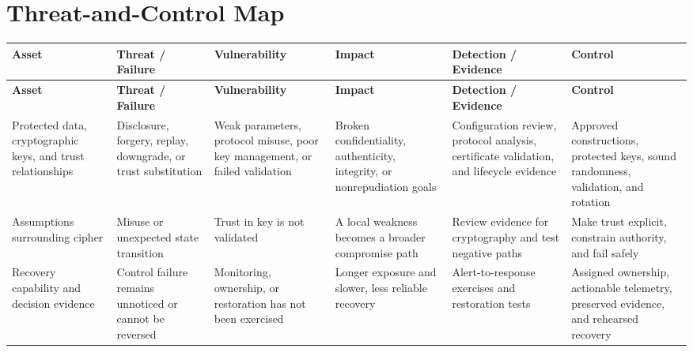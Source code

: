 \documentclass[11pt]{article}
\begin{document}
\section*{Threat-and-Control Map}
\begingroup\scriptsize\setlength{\tabcolsep}{2pt}
\begin{longtable}{>{\RaggedRight\arraybackslash}p{}>{\RaggedRight\arraybackslash}p{}>{\RaggedRight\arraybackslash}p{}>{\RaggedRight\arraybackslash}p{}>{\RaggedRight\arraybackslash}p{}>{\RaggedRight\arraybackslash}p{}}
\toprule\rowcolor{Navy}\color{white}\textbf{Asset} & \color{white}\textbf{Threat / Failure} & \color{white}\textbf{Vulnerability} & \color{white}\textbf{Impact} & \color{white}\textbf{Detection / Evidence} & \color{white}\textbf{Control}\\\midrule
\endfirsthead
\toprule\rowcolor{Navy}\color{white}\textbf{Asset} & \color{white}\textbf{Threat / Failure} & \color{white}\textbf{Vulnerability} & \color{white}\textbf{Impact} & \color{white}\textbf{Detection / Evidence} & \color{white}\textbf{Control}\\\midrule
\endhead
Protected data, cryptographic keys, and trust relationships & Disclosure, forgery, replay, downgrade, or trust substitution & Weak parameters, protocol misuse, poor key management, or failed validation & Broken confidentiality, authenticity, integrity, or nonrepudiation goals & Configuration review, protocol analysis, certificate validation, and lifecycle evidence & Approved constructions, protected keys, sound randomness, validation, and rotation\\\midrule
Assumptions surrounding cipher & Misuse or unexpected state transition & Trust in key is not validated & A local weakness becomes a broader compromise path & Review evidence for cryptography and test negative paths & Make trust explicit, constrain authority, and fail safely\\\midrule
Recovery capability and decision evidence & Control failure remains unnoticed or cannot be reversed & Monitoring, ownership, or restoration has not been exercised & Longer exposure and slower, less reliable recovery & Alert-to-response exercises and restoration tests & Assigned ownership, actionable telemetry, preserved evidence, and rehearsed recovery\\\midrule
\bottomrule
\end{longtable}
\endgroup
\end{document}

